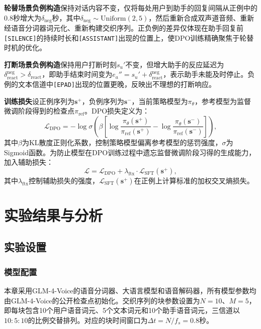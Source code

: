 \textbf{轮替场景负例构造}\quad 保持对话内容不变，仅将每处用户到助手的回复间隔从正例中的0.8秒增大为$\delta_{\text{neg}}$秒，其中$\delta_{\text{neg}} \sim \text{Uniform}(2, 5)$，然后重新合成双声道音频、重新经语音分词器词元化、重新构建交织序列。正负例的差异仅体现在助手回复前\texttt{[SILENCE]}的持续时长和\texttt{[ASSISTANT]}出现的位置上，使DPO训练精确聚焦于轮替时机的优化。

\textbf{打断场景负例构造}\quad 保持用户打断时刻$s_u'$不变，但增大助手的反应延迟为$\delta_{\text{react}}^{\text{neg}} > \delta_{\text{react}}$，即助手结束时间变为$e_a'' = s_u' + \delta_{\text{react}}^{\text{neg}}$，表示助手未能及时停止。负例的文本信道中\texttt{[EPAD]}出现的位置更晚，反映出不理想的打断响应。

\textbf{训练损失}\quad 设正例序列为$\mathbf{s}^+$，负例序列为$\mathbf{s}^-$，当前策略模型为$\pi_\theta$，参考模型为监督微调阶段得到的检查点$\pi_{\text{ref}}$。DPO损失定义为：
\begin{equation}
    \mathcal{L}_{\text{DPO}} = -\log \sigma \left( \beta \left[ \log \frac{\pi_\theta(\mathbf{s}^+)}{\pi_{\text{ref}}(\mathbf{s}^+)} - \log \frac{\pi_\theta(\mathbf{s}^-)}{\pi_{\text{ref}}(\mathbf{s}^-)} \right] \right),
\end{equation}
其中$\beta$为KL散度正则化系数，控制策略模型偏离参考模型的惩罚强度，$\sigma$为Sigmoid函数。为防止模型在DPO训练过程中遗忘监督微调阶段习得的生成能力，加入辅助损失：
\begin{equation}
    \mathcal{L} = \mathcal{L}_{\text{DPO}} + \lambda_{\text{ftx}} \cdot \mathcal{L}_{\text{SFT}}(\mathbf{s}^+),
\end{equation}
其中$\lambda_{\text{ftx}}$控制辅助损失的强度，$\mathcal{L}_{\text{SFT}}(\mathbf{s}^+)$在正例上计算标准的加权交叉熵损失。

\section{实验结果与分析}

\subsection{实验设置}

\subsubsection{模型配置}

本章采用GLM-4-Voice的语音分词器、大语言模型和语音解码器，所有模型参数均由GLM-4-Voice的公开检查点初始化。交织序列的块参数设置为$N=10$、$M=5$，即每块包含10个用户语音词元、5个文本词元和10个助手语音词元，三信道以$10:5:10$的比例交替排列。对应的块时间窗口为$\Delta t = N / f_s = 0.8$秒。

